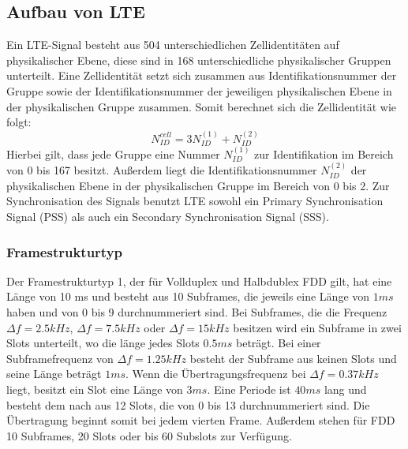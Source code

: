 \subsection{Aufbau von LTE}
Ein LTE-Signal besteht aus 504 unterschiedlichen Zellidentitäten auf physikalischer Ebene, diese sind in 168 unterschiedliche physikalischer Gruppen unterteilt. Eine Zellidentität setzt sich zusammen aus Identifikationsnummer der Gruppe sowie der Identifikationsnummer der jeweiligen physikalischen Ebene in der physikalischen Gruppe zusammen. Somit berechnet sich die Zellidentität wie folgt:
\begin{equation}
    N_{ID}^{cell}=3N_{ID}^{(1)}+N_{ID}^{(2)}
\end{equation}
Hierbei gilt, dass jede Gruppe eine Nummer $N_{ID}^{(1)}$ zur Identifikation im Bereich von 0 bis 167 besitzt. Außerdem liegt die Identifikationsnummer $N_{ID}^{(2)}$ der physikalischen Ebene in der physikalischen Gruppe im Bereich von 0 bis 2.
Zur Synchronisation des Signals benutzt LTE sowohl ein Primary Synchronisation Signal (PSS) als auch ein Secondary Synchronisation Signal (SSS).~\cite[S.~180]{etsi2021136}

\subsubsection{Framestrukturtyp}
Der Framestrukturtyp 1, der für Vollduplex und Halbdublex FDD gilt, hat eine Länge von 10 ms und besteht aus 10 Subframes, die jeweils eine Länge von $1ms$ haben und von 0 bis 9 durchnummeriert sind. Bei Subframes, die die Frequenz $\Delta f=2.5kHz$, $\Delta f=7.5kHz$ oder $\Delta f=15kHz$ besitzen wird ein Subframe in zwei Slots unterteilt, wo die länge jedes Slots $0.5ms$ beträgt. Bei einer Subframefrequenz von $\Delta f=1.25kHz$ besteht der Subframe aus keinen Slots und seine Länge beträgt $1ms$. Wenn die Übertragungsfrequenz bei $\Delta f=0.37kHz$ liegt, besitzt ein Slot eine Länge von $3ms$. Eine Periode ist $40ms$ lang und besteht dem nach aus 12 Slots, die von 0 bis 13 durchnummeriert sind. Die Übertragung beginnt somit bei jedem vierten Frame. Außerdem stehen für FDD 10 Subframes, 20 Slots oder bis 60 Subslots zur Verfügung.

